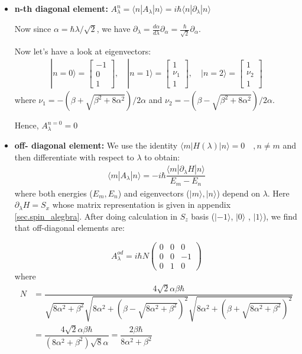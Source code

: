 \documentclass[11pt,a4paper]{article}
\begin{document}
\begin{itemize}
\item \textbf{n-th diagonal element:} $A_{\lambda}^n= \langle n |A_{\lambda} | n \rangle=  i \hbar\langle n |\partial_{\lambda} | n \rangle $

Now since $\alpha= \hbar \lambda/ \sqrt{2} $, we have $\partial_{\lambda}=  \frac{d \alpha}{d \lambda}\partial_{\alpha} =\frac{\hbar}{\sqrt{2}} \partial_{\alpha}$.

 Now let's have a look at eigenvectors:
\begin{align*}
| n=0 \rangle = \begin{bmatrix}
-1 \\
0 \\
1
\end{bmatrix}, \quad | n=1 \rangle = \begin{bmatrix}
1 \\
\nu_1 \\
1 
\end{bmatrix}
, \quad 
| n=2 \rangle = \begin{bmatrix}
1 \\
\nu_2 \\
1 
\end{bmatrix}
\end{align*}
where $\nu_1= -(\beta + \sqrt{\beta^2 + 8 \alpha^2})/2 \alpha $ and $\nu_2=-(\beta - \sqrt{\beta^2 + 8 \alpha^2})/2 \alpha$.

Hence, $A_{\lambda}^{n=0}= 0$
\item \textbf{off- diagonal element:} We use the identity $\langle m |H(\lambda) | n \rangle=0 \quad, n \neq m$ and then differentiate with respect to $\lambda$ to obtain:
\begin{align}
\langle m |A_{\lambda} | n \rangle =  -i \hbar \dfrac{\langle m |\partial_{\lambda}H | n \rangle}{E_m-E_n}
\end{align}
where both  energies ($E_m, E_n$) and eigenvectors ($|m \rangle, |n \rangle$) depend on $\lambda$.
Here $\partial_{\lambda} H=S_x$ whose matrix representation is given in appendix \ref{sec.spin_alegbra}. After doing calculation in $S_z$ basis ($|- 1\rangle$, $| 0 \rangle$ , $| 1 \rangle$), we find that off-diagonal elements are:

\begin{equation}
A_{\lambda}^{od}=i\hbar N
\begin{pmatrix}
0 & 0 & 0\\
0 & 0 & -1 \\
0 & 1 & 0
\end{pmatrix}
\end{equation}
where 
\begin{align*}
N &=\dfrac{4\sqrt{2} \alpha \beta \hbar}{\sqrt{8 \alpha^{2} + \beta^{2}} \sqrt{8 \alpha^{2} + \left(\beta - \sqrt{8 \alpha^{2} + \beta^{2}}\right)^{2}} \sqrt{8 \alpha^{2} + \left(\beta + \sqrt{8 \alpha^{2} + \beta^{2}}\right)^{2}}}\\
&=\dfrac{4\sqrt{2} \alpha \beta \hbar}{(8 \alpha^{2} + \beta^{2}) \sqrt{8} \alpha}=
\dfrac{2 \beta \hbar}{8 \alpha^{2} + \beta^{2}}
\end{align*}



\end{itemize}
\end{document}
